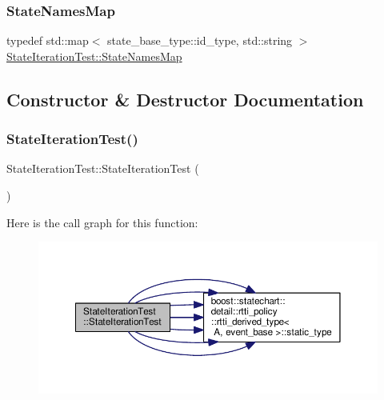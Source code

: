 \mbox{\label{struct_state_iteration_test_ad2b113061c6f1d153adf3013b32e75c0}} 
\subsubsection{\texorpdfstring{State\+Names\+Map}{StateNamesMap}}
{\footnotesize\ttfamily typedef std\+::map$<$ state\+\_\+base\+\_\+type\+::id\+\_\+type, std\+::string $>$ \mbox{\hyperlink{struct_state_iteration_test_ad2b113061c6f1d153adf3013b32e75c0}{State\+Iteration\+Test\+::\+State\+Names\+Map}}\hspace{0.3cm}{\ttfamily [private]}}



\subsection{Constructor \& Destructor Documentation}
\mbox{\label{struct_state_iteration_test_a02eecebd37021d75721d681a5a4ae310}} 
\subsubsection{\texorpdfstring{State\+Iteration\+Test()}{StateIterationTest()}}
{\footnotesize\ttfamily State\+Iteration\+Test\+::\+State\+Iteration\+Test (\begin{DoxyParamCaption}{ }\end{DoxyParamCaption})}

Here is the call graph for this function\+:
\nopagebreak
\begin{figure}[H]
\begin{center}
\leavevmode
\includegraphics[width=350pt]{struct_state_iteration_test_a02eecebd37021d75721d681a5a4ae310_cgraph}
\end{center}
\end{figure}


